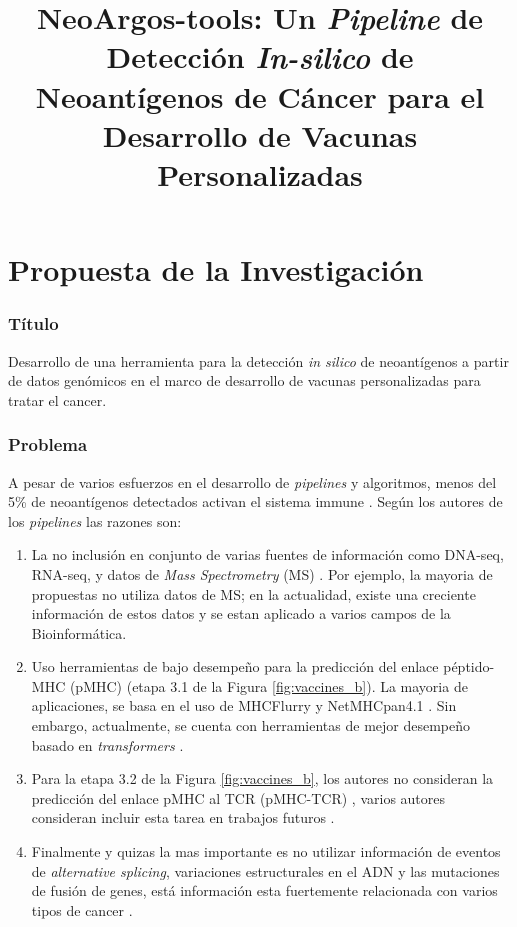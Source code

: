 \documentclass[a4paper,11pt]{article}
\title{ 
	
	NeoArgos-tools: Un \textit{Pipeline} de Detección \textit{In-silico} de Neoantígenos de Cáncer para el Desarrollo de Vacunas Personalizadas
}
\author{}
\date{}
\begin{document}
	

	
	
	
	
	
	
	

\part*{Propuesta de la Investigación}

\section{Título}
Desarrollo de una herramienta  para la detección \textit{in silico} de neoantígenos a partir de datos genómicos en el marco de desarrollo de vacunas personalizadas para tratar el cancer.

\section{Problema}

A pesar de varios esfuerzos en el desarrollo de \textit{pipelines} y algoritmos, menos del 5\% de neoantígenos detectados activan el sistema immune \citep{de2020neoantigen, mill2022neoms, bulik2019deep, bassani2015mass, yadav2014predicting}. Según los autores de los \textit{pipelines} las razones son: 

\begin{enumerate}
	\item La no inclusión en conjunto de varias fuentes de información como DNA-seq, RNA-seq, y datos de \textit{Mass Spectrometry} (MS) \citep{kim2018neopepsee}. Por ejemplo, la mayoria de  propuestas no utiliza datos de MS; en la actualidad, existe una creciente información de estos datos y se estan aplicado a varios campos de la Bioinformática.
	\item  Uso herramientas de bajo desempeño para la predicción del enlace péptido-MHC (pMHC) (etapa 3.1  de la Figura \ref{fig:vaccines_b}). La mayoria de aplicaciones, se basa en el uso de MHCFlurry \citep{o2020mhcflurry} y NetMHCpan4.1 \citep{reynisson2020netmhcpan}. Sin embargo, actualmente, se cuenta con herramientas de mejor desempeño basado en \textit{transformers} \citep{arceda2023neoantigen}.
	\item Para la etapa 3.2 de la Figura \ref{fig:vaccines_b}, los autores no consideran  la predicción del enlace pMHC al TCR (pMHC-TCR) , varios autores consideran incluir esta tarea en trabajos futuros  \citep{rubinsteyn2018computational}.
	\item Finalmente y quizas la mas importante es no utilizar información de eventos de \textit{alternative splicing}, variaciones estructurales en el ADN y las mutaciones de fusión de genes, está información esta fuertemente relacionada con varios tipos de cancer \citep{wood2020neoepiscope}.
\end{enumerate}
\end{document}
